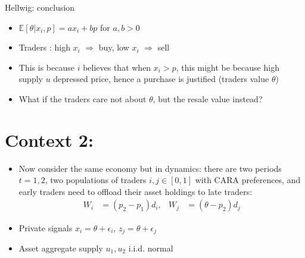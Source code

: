 \documentclass[english,10pt
,aspectratio=169
]{beamer}
\begin{document}
\begin{frame}{Hellwig: conclusion}
	\begin{itemize}
		\item $\mathbb{E} \left[ \theta | x_i, p\right] = a x_i + b p$ for $a,b>0$
		\item Traders : high $x_i$ $\Rightarrow$ buy, low $x_i$ $\Rightarrow$ sell
		\item This is because $i$ believes that when $x_i > p$, this might be because high supply $u$ depressed price, hence a purchase is justified (traders  value $\theta$)
		\pause
		\item What if the traders care not about $\theta$, but the resale value instead?
	\end{itemize}
\end{frame}



\section{Context 2: \cite{brown_technical_1989}}

\begin{frame}{\cite{brown_technical_1989}}
	\begin{itemize}
		\item Now consider the same economy but in dynamics: there are two periods $t=1,2$, two populations of traders $i,j \in [0,1]$ with CARA preferences, and early traders need to offload their asset holdings to late traders:
		\begin{align*}
			W_i & = (p_2 - p_1) d_i, &
			W_j & = (\theta - p_2) d_j
		\end{align*}
		\item Private signals $x_i = \theta + \epsilon_i$, $z_j = \theta + \epsilon_j$
		\item Asset aggregate supply $u_1,u_2$ i.i.d. normal
	\end{itemize}
\end{frame}
\end{document}
